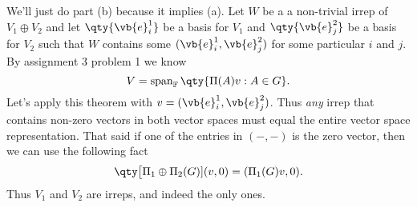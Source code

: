 \documentclass[
	pages,
	boxes,
	color=WildStrawberry
]{homework}
\begin{document}
\begin{solution}
	We'll just do part (b) because it implies (a). Let $W$ be a a non-trivial irrep of $V_1\oplus V_2$ and let $\qty{\vb{e}_i^1}$ be a basis for $V_1$ and $\qty{\vb{e}_j^2}$ be a basis for $V_2$ such that $W$ contains some $(\vb{e}_i^1, \vb{e}_j^2)$ for some particular $i$ and $j$. By assignment 3 problem 1 we know
	\begin{equation*}
		V = \vspan_\F\qty{\Pi(A)v : A\in G}.
	\end{equation*}
	Let's apply this theorem with $v = (\vb{e}_i^1, \vb{e}_j^2)$. Thus \emph{any} irrep that contains non-zero vectors in both vector spaces must equal the entire vector space representation. That said if one of the entries in $(-,-)$ is the zero vector, then we can use the following fact
	\begin{equation*}
		\qty\big[\Pi_1\oplus\Pi_2(G)](v, 0) = (\Pi_1(G)v, 0).
	\end{equation*}
	Thus $V_1$ and $V_2$ are irreps, and indeed the only ones.
\end{solution}
\end{document}
